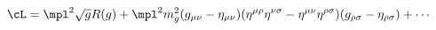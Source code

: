 \begin{equation}
\cL = 
\mpl^2 \sqrt{g} R ( g ) + 
\mpl^2 m^2_g 
( g_{\mu \nu} - \eta_{\mu \nu} ) 
( \eta^{\mu \rho} \eta^{\nu \sigma} - \eta^{\mu \nu}\eta^{\rho \sigma} ) 
( g_{\rho \sigma} - \eta_{\rho \sigma} )
+ \cdots
\label{lmin}
\end{equation}

